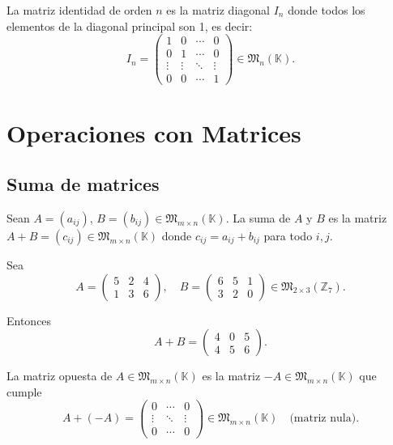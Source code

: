 \documentclass[a4paper,12pt]{article}
\begin{document}
\begin{procedimiento}[title=Matriz identidad]
La matriz identidad de orden $n$ es la matriz diagonal $I_n$ donde todos los elementos de la diagonal principal son 1, es decir:
\[
I_n =
\begin{pmatrix}
1 & 0 & \cdots & 0 \\
0 & 1 & \cdots & 0 \\
\vdots & \vdots & \ddots & \vdots \\
0 & 0 & \cdots & 1
\end{pmatrix} \in \mathfrak{M}_n(\mathbb{K}).
\]
\end{procedimiento}

\section{Operaciones con Matrices}

\subsection{Suma de matrices}

\begin{procedimiento}[title=Suma]
Sean $A = (a_{ij})$, $B = (b_{ij}) \in \mathfrak{M}_{m \times n}(\mathbb{K})$. La suma de $A$ y $B$ es la matriz $A+B = (c_{ij}) \in \mathfrak{M}_{m \times n}(\mathbb{K})$ donde $c_{ij} = a_{ij} + b_{ij}$ para todo $i,j$.
\end{procedimiento}

\begin{ejemplo}[title=Ejemplo de suma de matrices]
Sea
\[
A=
\begin{pmatrix}
5 & 2 & 4 \\
1 & 3 & 6
\end{pmatrix},
\quad
B=
\begin{pmatrix}
6 & 5 & 1 \\
3 & 2 & 0
\end{pmatrix}
\in \mathfrak{M}_{2 \times 3}(\mathbb{Z}_7).
\]

Entonces
\[
A + B =
\begin{pmatrix}
4 & 0 & 5 \\
4 & 5 & 6
\end{pmatrix}.
\]
\end{ejemplo}

\begin{procedimiento}[title=Matriz opuesta]
La matriz opuesta de $A \in \mathfrak{M}_{m \times n}(\mathbb{K})$ es la matriz $-A \in \mathfrak{M}_{m \times n}(\mathbb{K})$ que cumple
\[
A + (-A) =
\begin{pmatrix}
0 & \cdots & 0 \\
\vdots & \ddots & \vdots \\
0 & \cdots & 0
\end{pmatrix} \in \mathfrak{M}_{m \times n}(\mathbb{K}) \quad \text{(matriz nula)}.
\]
\end{procedimiento}
\end{document}
